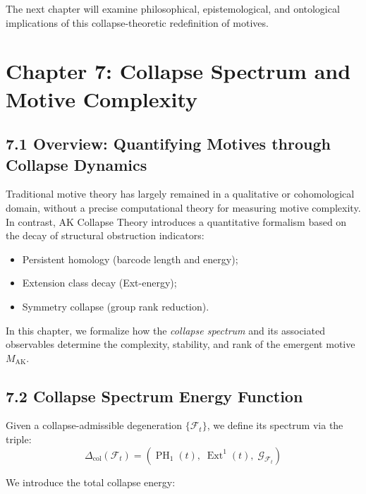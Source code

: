 \documentclass[11pt]{article}
\DeclareMathOperator{\Ext}{Ext}
\DeclareMathOperator{\PH}{PH}
\begin{document}
The next chapter will examine philosophical, epistemological, and ontological implications of this collapse-theoretic redefinition of motives.

\FloatBarrier




\section{Chapter 7: Collapse Spectrum and Motive Complexity}

\subsection{7.1 Overview: Quantifying Motives through Collapse Dynamics}

Traditional motive theory has largely remained in a qualitative or cohomological domain, without a precise computational theory for measuring motive complexity. In contrast, AK Collapse Theory introduces a quantitative formalism based on the decay of structural obstruction indicators:

\begin{itemize}
    \item Persistent homology (barcode length and energy);
    \item Extension class decay (Ext-energy);
    \item Symmetry collapse (group rank reduction).
\end{itemize}

In this chapter, we formalize how the \emph{collapse spectrum} and its associated observables determine the complexity, stability, and rank of the emergent motive $M_{\mathrm{AK}}$.

\subsection{7.2 Collapse Spectrum Energy Function}

Given a collapse-admissible degeneration $\{ \mathcal{F}_t \}$, we define its spectrum via the triple:
\[
\Delta_{\mathrm{col}}(\mathcal{F}_t) = \left( \PH_1(t), \; \Ext^1(t), \; \mathcal{G}_{\mathcal{F}_t} \right)
\]

We introduce the total collapse energy:
\end{document}
